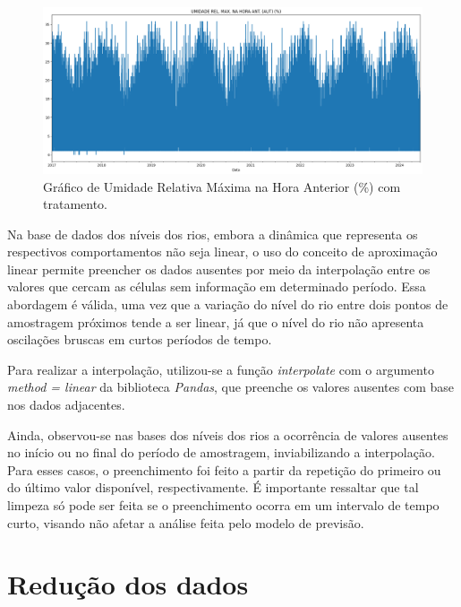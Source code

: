 \begin{figure}[H]
	\caption{\label{fig:dados_outlier_com_tratamento}Gráfico de Umidade Relativa Máxima  na Hora Anterior (\%) com tratamento.}
	\begin{center}
		\includegraphics[scale=0.35]{figuras/UMIDADE REL. MAX. NA HORA ANT. (AUT) COM TRATAMENTO.png}
	\end{center}
\end{figure}

Na base de dados dos níveis dos rios, embora a dinâmica que representa os respectivos comportamentos não seja linear, o uso do conceito de aproximação linear permite preencher os dados ausentes por meio da interpolação entre os valores que cercam as células sem informação em determinado período. Essa abordagem é válida, uma vez que a variação do nível do rio entre dois pontos de amostragem próximos tende a ser linear, já que o nível do rio não apresenta oscilações bruscas em curtos períodos de tempo.

Para realizar a interpolação, utilizou-se a função \textit{interpolate} com o argumento \textit{method = linear} da biblioteca \textit{Pandas}, que preenche os valores ausentes com base nos dados adjacentes.

Ainda, observou-se nas bases dos níveis dos rios a ocorrência de valores ausentes no início ou no final do período de amostragem, inviabilizando a interpolação. Para esses casos, o preenchimento foi feito a partir da repetição do primeiro ou do último valor disponível, respectivamente. É importante ressaltar que tal limpeza só pode ser feita se o preenchimento ocorra em um intervalo de tempo curto, visando não afetar a análise feita pelo modelo de previsão.

\section{Redução dos dados}

